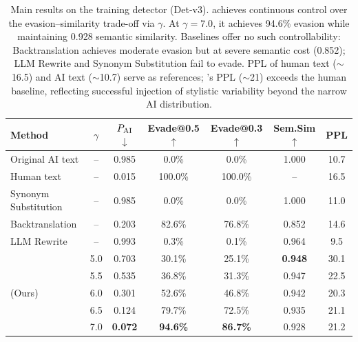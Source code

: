 \begin{table}[t]
\centering
\small
\begin{tabular}{l c cccc c}
\toprule
\textbf{Method} & $\gamma$ & $P_{\text{AI}}$$\downarrow$ & \textbf{Evade@0.5}$\uparrow$ & \textbf{Evade@0.3}$\uparrow$ & \textbf{Sem.Sim}$\uparrow$ & \textbf{PPL} \\
\midrule
Original AI text & -- & 0.985 & 0.0\% & 0.0\% & 1.000 & 10.7 \\
Human text & -- & 0.015 & 100.0\% & 100.0\% & -- & 16.5 \\
\midrule
Synonym Substitution & -- & 0.985 & 0.0\% & 0.0\% & 1.000 & 11.0 \\
Backtranslation & -- & 0.203 & 82.6\% & 76.8\% & 0.852 & 14.6 \\
LLM Rewrite & -- & 0.993 & 0.3\% & 0.1\% & 0.964 & 9.5 \\
\midrule
\multirow{5}{*}{\styleshield{} (Ours)} 
& 5.0 & 0.703 & 30.1\% & 25.1\% & \textbf{0.948} & 30.1 \\
& 5.5 & 0.535 & 36.8\% & 31.3\% & 0.947 & 22.5 \\
& 6.0 & 0.301 & 52.6\% & 46.8\% & 0.942 & 20.3 \\
& 6.5 & 0.124 & 79.7\% & 72.5\% & 0.935 & 21.1 \\
& 7.0 & \textbf{0.072} & \textbf{94.6\%} & \textbf{86.7\%} & 0.928 & 21.2 \\
\bottomrule
\end{tabular}
\caption{Main results on the training detector (Det-v3). \styleshield{} achieves continuous control over the evasion--similarity trade-off via $\gamma$. At $\gamma{=}7.0$, it achieves 94.6\% evasion while maintaining 0.928 semantic similarity. Baselines offer no such controllability: Backtranslation achieves moderate evasion but at severe semantic cost (0.852); LLM Rewrite and Synonym Substitution fail to evade. PPL of human text (${\sim}$16.5) and AI text (${\sim}$10.7) serve as references; \styleshield{}'s PPL (${\sim}$21) exceeds the human baseline, reflecting successful injection of stylistic variability beyond the narrow AI distribution.}
\label{tab:main_results}
\end{table}
